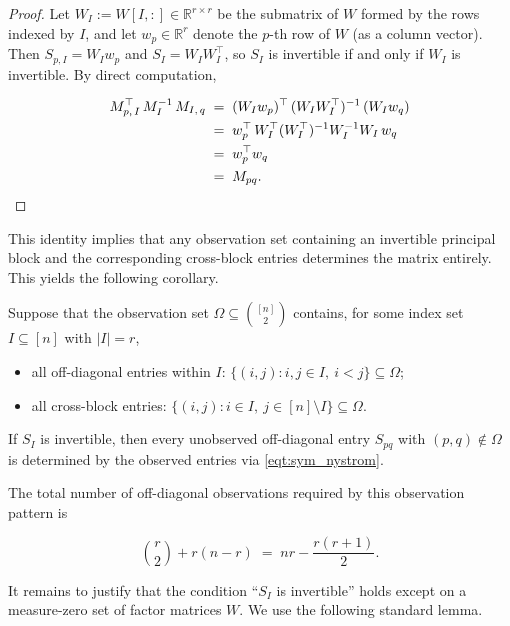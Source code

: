 \documentclass{article}
\begin{document}
\begin{proof}
Let $W_I := W[I, :] \in \mathbb{R}^{r \times r}$ be the submatrix of $W$ formed by the rows indexed by $I$, and let $w_p \in \mathbb{R}^r$ denote the $p$-th row of $W$ (as a column vector). Then $S_{p,I} = W_I w_p$ and $S_I = W_I W_I^\top$, so $S_I$ is invertible if and only if $W_I$ is invertible. By direct computation,

\begin{align}
M_{p,\,I}^\top \, M_I^{-1} \, M_{I,\,q}
&\;=\; (W_I w_p)^\top \, (W_I W_I^\top)^{-1} \, (W_I w_q) \\
& \;=\; w_p^\top \, W_I^\top (W_I^\top)^{-1} W_I^{-1} W_I \, w_q \\
& \;=\; w_p^\top w_q \\
& \;=\; M_{pq}. \qedhere
\end{align}
\end{proof}

This identity implies that any observation set containing an invertible principal block and the corresponding cross-block entries determines the matrix entirely. This yields the following corollary.

\begin{corollary}
\label{cor:sym_leakage}
Suppose that the observation set $\Omega \subseteq \binom{[n]}{2}$ contains, for some index set $I \subseteq [n]$ with $|I| = r$,
\begin{itemize}
\item all off-diagonal entries within $I$:
$\{(i,j) : i, j \in I,\ i < j\} \subseteq \Omega$;
\item all cross-block entries:
$\{(i,j) : i \in I,\ j \in [n] \setminus I\} \subseteq \Omega$.
\end{itemize}
If $S_I$ is invertible, then every unobserved off-diagonal entry $S_{pq}$ with $(p, q) \notin \Omega$ is determined by the observed entries via \eqref{eqt:sym_nystrom}.
\end{corollary}

The total number of off-diagonal observations required by this observation pattern is

\begin{equation}
\binom{r}{2} + r(n - r) \;=\; nr - \frac{r(r+1)}{2}.
\end{equation}

It remains to justify that the condition ``$S_I$ is invertible'' holds except on a measure-zero set of factor matrices $W$. We use the following standard lemma.
\end{document}

